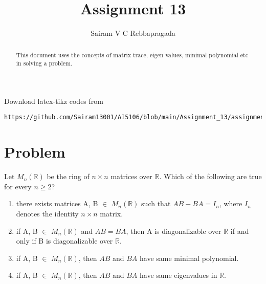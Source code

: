 \documentclass[journal,12pt,twocolumn]{IEEEtran}
\begin{document}
\makeatletter
{}
\makeatother
\let\StandardTheFigure\thefigure
\let\vec\mathbf
\renewcommand{\thefigure}{\theproblem}
\def\putbox#1#2#3{\makebox[0in][l]{\makebox[#1][l]{}\raisebox{\baselineskip}[0in][0in]{\raisebox{#2}[0in][0in]{#3}}}}
     \def\rightbox#1{\makebox[0in][r]{#1}}
     \def\centbox#1{\makebox[0in]{#1}}
     \def\topbox#1{\raisebox{-\baselineskip}[0in][0in]{#1}}
     \def\midbox#1{\raisebox{-0.5\baselineskip}[0in][0in]{#1}}
\vspace{3cm}
\title{Assignment 13}
\author{Sairam V C Rebbapragada}
\maketitle
\newpage
\bigskip
\renewcommand{\thefigure}{\theenumi}
\renewcommand{\thetable}{\theenumi}
\begin{abstract}
This document uses the concepts of matrix trace, eigen values, minimal polynomial etc in solving a problem. 
\end{abstract}

Download latex-tikz codes from 
%
\begin{lstlisting}
https://github.com/Sairam13001/AI5106/blob/main/Assignment_13/assignment_13.tex
\end{lstlisting}

\section{Problem}
Let $M_n(\mathbb{R})$ be the ring of $n \times n$ matrices over $\mathbb{R}$. Which of the following are true for every $n\geq 2$?
\begin{enumerate}
    \item there exists matrices A, B $\in$ $M_n(\mathbb{R})$ such that $AB - BA = I_n$, where $I_n$ denotes the identity $n \times n$ matrix.
    \item if A, B $\in$ $M_n(\mathbb{R})$ and $AB = BA$, then A is diagonalizable over $\mathbb{R}$ if and only if B is diagonalizable over $\mathbb{R}$.
    \item if A, B $\in$ $M_n(\mathbb{R})$, then $AB$ and $BA$ have same minimal polynomial.
    \item if A, B $\in$ $M_n(\mathbb{R})$, then $AB$ and $BA$ have same eigenvalues in $\mathbb{R}$.
\end{enumerate}
\end{document}
